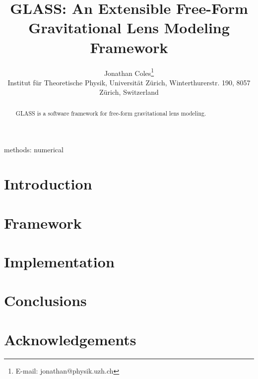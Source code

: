\documentclass[useAMS,usenatbib]{mn2e}
\date{}
\title[GLASS]{GLASS: An Extensible Free-Form Gravitational Lens Modeling Framework}
\author[Jonathan Coles]%
{Jonathan Coles\thanks{E-mail: jonathan@physik.uzh.ch}\\%
Institut f\"ur Theoretische Physik, Universit\"at Z\"urich,
Winterthurerstr. 190, 8057 Z\"urich, Switzerland}
\begin{document}
\maketitle

\label{firstpage}

\begin{abstract}
GLASS is a software framework for free-form gravitational lens modeling.

\end{abstract}
\begin{keywords}
methods: numerical
\end{keywords}

\section{Introduction}
\label{introduction}

\section{Framework}
\label{framework}

\section{Implementation}
\label{implementation}


\section{Conclusions}
\label{outlook}

\section*{Acknowledgements}





\bsp

\label{lastpage}
\end{document}
